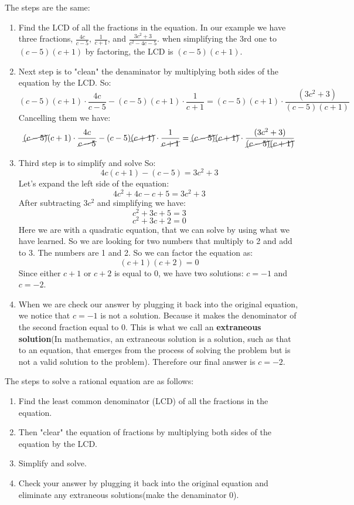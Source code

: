 The steps are the same: 
\begin{enumerate}
    \item Find the LCD of all the fractions in the equation. In our example we have three fractions, $\displaystyle \frac{4c}{c-5}$, $\displaystyle  \frac{1}{c+1}$, and $\displaystyle \frac{3c^2+3}{c^2-4c-5}$. when simplifying the 3rd one to $(c-5)(c+1)$ by factoring, the LCD is $(c-5)(c+1)$.
    \item Next step is to "clean" the denaminator  by multiplying both sides of the equation by the LCD. So:
    $$ (c-5)(c+1) \cdot \frac{4c}{c-5} - (c-5)(c+1) \cdot \frac{1}{c+1} = (c-5)(c+1) \cdot \frac{(3c^2+3)}{(c-5)(c+1)}$$
    Cancelling them we have:
    $$ \cancel{(c-5)}(c+1) \cdot \frac{4c}{\cancel{c-5}} - (c-5)\cancel{(c+1)} \cdot \frac{1}{\cancel{c+1}} = \cancel{(c-5)}\cancel{(c+1)} \cdot \frac{(3c^2+3)}{\cancel{(c-5)}\cancel{(c+1)}}$$
    \item Third step is to simplify and solve So: 
    $$ 4c(c+1) - (c-5) = 3c^2+3$$
    Let's expand the left side of the equation:
    $$ 4c^2+4c - c + 5 = 3c^2+3$$
    After subtracting $3c^2$ and simplifying we have:
    $$ c^2+3c+5 = 3$$
    $$ c^2+3c+2 = 0$$
    Here we are with a quadratic equation, that we can solve by using what we have learned. 
    So we are looking for two numbers that multiply to 2 and add to 3. The numbers are 1 and 2. So we can factor the equation as:
    $$ (c+1)(c+2) = 0$$
    Since either $c+1$ or $c+2$ is equal to 0, we have two solutions: $c = -1$ and $c = -2$.
    \item When we are check our answer by plugging it back into the original equation, we notice that $c=-1$ is not a solution. Because it makes the denominator of the second fraction equal to 0. This is what we call an \textbf{extraneous solution}(In mathematics, an extraneous solution is a solution, such as that to an equation, that emerges from the process of solving the problem but is not a valid solution to the problem).
    Therefore our final answer is $c = -2$.
\end{enumerate}
The steps to solve a rational equation are as follows:
\begin{enumerate}
    \item Find the least common denominator (LCD) of all the fractions in the equation. 
    \item Then "clear" the equation of fractions by multiplying both sides of the equation by the LCD.
    \item  Simplify and solve.
    \item Check your answer by plugging it back into the original equation and eliminate any extraneous solutions(make the denaminator 0).
\end{enumerate}